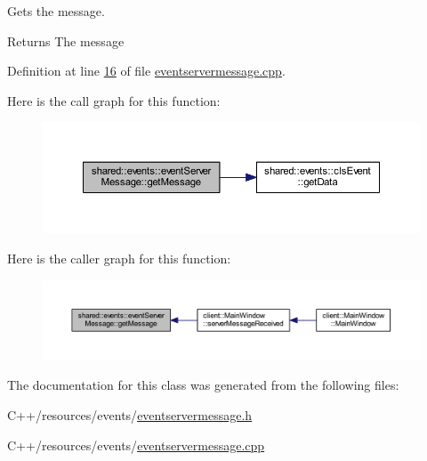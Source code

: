 Gets the message. 

\begin{DoxyReturn}{Returns}
The message 
\end{DoxyReturn}


Definition at line \hyperlink{eventservermessage_8cpp_source_l00016}{16} of file \hyperlink{eventservermessage_8cpp_source}{eventservermessage.\-cpp}.



Here is the call graph for this function\-:\nopagebreak
\begin{figure}[H]
\begin{center}
\leavevmode
\includegraphics[width=350pt]{d6/dfe/classshared_1_1events_1_1event_server_message_a8d893e8dbb1289d2552a3a48d1323edd_cgraph}
\end{center}
\end{figure}




Here is the caller graph for this function\-:
\nopagebreak
\begin{figure}[H]
\begin{center}
\leavevmode
\includegraphics[width=350pt]{d6/dfe/classshared_1_1events_1_1event_server_message_a8d893e8dbb1289d2552a3a48d1323edd_icgraph}
\end{center}
\end{figure}




The documentation for this class was generated from the following files\-:\begin{DoxyCompactItemize}
\item 
C++/resources/events/\hyperlink{eventservermessage_8h}{eventservermessage.\-h}\item 
C++/resources/events/\hyperlink{eventservermessage_8cpp}{eventservermessage.\-cpp}\end{DoxyCompactItemize}
